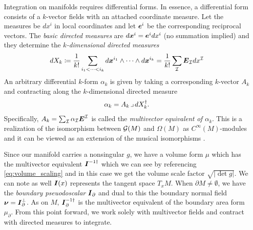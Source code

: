 \documentclass{article}
\begin{document}
Integration on manifolds requires differential forms. In essence, a differential form consists of a $k$-vector fields with an attached coordinate measure. Let the measures be $dx^i$ in local coordinates and let $\boldsymbol{e}^i$ be the corresponding reciprocal vectors. The \emph{basic directed measures} are $d\boldsymbol{x}^i = \boldsymbol{e}^i dx^i$ (no summation implied) and they determine the \emph{$k$-dimensional directed measures}
\begin{equation}
    dX_k \coloneqq \frac{1}{k!} \sum_{i_1 < \cdots < i_k} d\boldsymbol{x}^{i_1}\wedge \cdots \wedge d\boldsymbol{x}^{i_k} = \frac{1}{k!} \sum_{\mathcal{I}} \boldsymbol{E}_{\mathcal{I}} dx^{\mathcal{I}}
\end{equation}
An arbitrary differential $k$-form $\alpha_k$ is given by taking a corresponding $k$-vector $A_k$ and contracting along the $k$-dimensional directed measure
\begin{equation}
\alpha_k = A_k \hspace*{.5mm}\lrcorner \hspace*{.5mm} dX_k^\dagger.
\end{equation}
Specifically, $A_k = \sum_{\mathcal{I}} \alpha_{\mathcal{I}} \boldsymbol{E}^{\mathcal{I}}$ is called the \emph{multivector equivalent of $\alpha_k$}. This is a realization of the isomorphism between $\mathcal{G}(M)$ and $\Omega(M)$ as $C^\infty(M)$-modules and it can be viewed as an extension of the musical isomorphisms \cite[chapter 13]{lee_introduction_2012}. 

Since our manifold carries a nonsingular $g$, we have a volume form $\mu$ which has the multivector equivalent $\boldsymbol{I}^{-1 \dagger}$ which we can see by referencing \cref{eq:volume_scaling} and in this case we get the volume scale factor $\sqrt{|\det g|}$. We can note as well $\boldsymbol{I}(x)$ represents the tangent space $T_x M$. When $\partial M \neq \emptyset$, we have the \emph{boundary pseuodoscalar} $\boldsymbol{I}_\partial$ and dual to this the boundary normal field $\boldsymbol{\nu} = \boldsymbol{I}_\partial^\perp$. As on $M$, $\boldsymbol{I}_\partial^{-1 \dagger}$ is the multivector equivalent of the boundary area form $\mu_\partial$. From this point forward, we work solely with multivector fields and contract with directed measures to integrate. 
\end{document}
